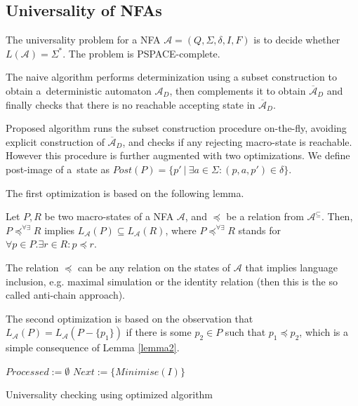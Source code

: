 \subsection{Universality of NFAs}\label{NFAuniv}

The universality problem for a NFA $\mathcal{A} = (Q, \Sigma, \delta, I, F)$ is
to decide whether $L(\mathcal{A}) = \Sigma^*$. The problem is PSPACE-complete.

The naive algorithm performs determinization using a subset construction to
obtain a~deterministic automaton $\mathcal{A}_D$, then complements it to obtain
$\overline{\mathcal{A}}_D$ and finally checks that there is no reachable
accepting state in $\overline{\mathcal{A}}_D$.

Proposed algorithm \cite{tacas} runs the subset construction procedure
on-the-fly, avoiding explicit construction of $\overline{\mathcal{A}}_D$, and
checks if any rejecting macro-state is reachable. However this procedure is
further augmented with two optimizations. We define post-image of a~state as
$Post(P) = \{p'\ |\ \exists a \in \Sigma: (p, a, p') \in \delta\}$.

The first optimization is based on the following lemma.

\begin{lemma}\label{lemma2}
 Let $P, R$ be two macro-states of a NFA $\mathcal{A}$, and $\preceq$ be a
 relation from $\mathcal{A}^\subseteq$. Then, $P \preceq^{\forall\exists} R$
 implies $L_\mathcal{A}(P) \subseteq L_\mathcal{A}(R)$, where $P
 \preceq^{\forall\exists} R$ stands for $\forall p \in P. \exists r\in R : p
 \preceq r$.
\end{lemma}

The relation $\preceq$ can be any relation on the states of $\mathcal{A}$ that
implies language inclusion, e.g. maximal simulation or the identity relation
(then this is the so called anti-chain approach).

The second optimization is based on the observation that $L_\mathcal{A}(P) =
L_\mathcal{A}(P - \{p_1\})$ if there is some $p_2 \in P$ such that $p_1 \preceq 
p_2$, which is a simple consequence of Lemma \ref{lemma2}.

\begin{algorithm}[hb!]
		\BlankLine
		$Processed := \emptyset$\;
		$Next := \{Minimise(I)\}$\;
		\caption{Universality checking using optimized algorithm \cite{tacas}}\label{universality}
	\end{algorithm}
	
